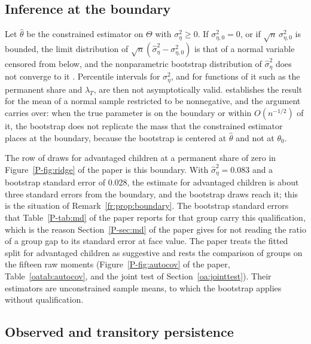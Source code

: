 \subsection{Inference at the boundary}

\begin{remark}
\label{fr:prop:boundary}
Let $\hat\theta$ be the constrained estimator on $\Theta$ with
$\sigma^2_\eta \ge 0$. If $\sigma^2_{\eta,0} = 0$, or if
$\sqrt{n}\,\sigma^2_{\eta,0}$ is bounded, the limit distribution of
$\sqrt{n}(\hat\sigma^2_\eta - \sigma^2_{\eta,0})$ is that of a normal
variable censored from below, and the nonparametric bootstrap
distribution of $\hat\sigma^2_\eta$ does not converge to it
\citep{Andrews2000}. Percentile intervals for $\sigma^2_\eta$, and for
functions of it such as the permanent share and $\lambda_T$, are then not
asymptotically valid. \citet{Andrews2000} establishes the result for the mean of a normal
sample restricted to be nonnegative, and the argument carries over: when
the true parameter is on the boundary or within $O(n^{-1/2})$ of it, the
bootstrap does not replicate the mass that the constrained estimator
places at the boundary, because the bootstrap is centered at
$\hat\theta$ and not at $\theta_0$.
\end{remark}

The row of draws for advantaged children at a permanent share of zero in
Figure~\ref{P-fig:ridge} of the paper is this boundary. With
$\hat\sigma^2_\eta = 0.083$ and a bootstrap standard error of 0.028, the
estimate for advantaged children is about three standard errors from the
boundary, and the bootstrap draws reach it; this is the situation of
Remark~\ref{fr:prop:boundary}. The bootstrap standard
errors that Table~\ref{P-tab:md} of the paper reports for that group
carry this qualification, which is the reason
Section~\ref{P-sec:md} of the paper gives for not reading the ratio of a
group gap to its standard error at face value. The paper treats the
fitted split for advantaged children as suggestive and rests the
comparison of groups on
the fifteen raw moments (Figure~\ref{P-fig:autocov} of the paper, Table~\ref{oatab:autocov}, and the
joint test of Section~\ref{oa:jointtest}). Their
estimators are unconstrained sample means, to which the bootstrap applies
without qualification.

\subsection{Observed and transitory persistence}

